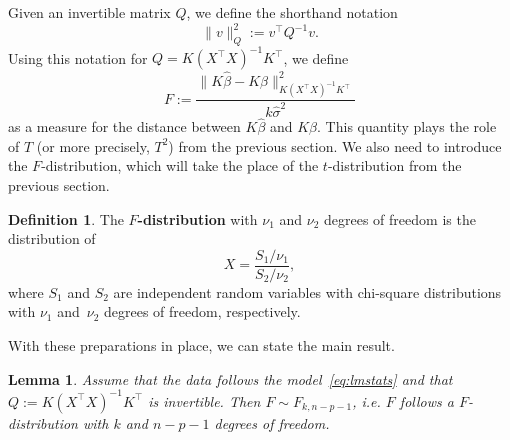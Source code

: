 \documentclass[
  a4paper,
]{article}
\newtheorem{lemma}{Lemma}[section]
\theoremstyle{definition}
\newtheorem{definition}{Definition}[section]
\theoremstyle{definition}
\theoremstyle{definition}
\theoremstyle{definition}
\theoremstyle{remark}
\begin{document}
Given an invertible matrix \(Q\), we define the shorthand notation
\begin{equation*}
  \| v \|_Q^2
  := v^\top Q^{-1} v.
\end{equation*}
Using this notation for \(Q = K(X^\top X)^{-1} K^\top\), we define
\begin{equation}
  F
  := \frac{\bigl\| K \hat\beta - K \beta \bigr\|_{K(X^\top X)^{-1} K^\top}^2}
          {k \hat\sigma^2} \label{eq:simult-F}
\end{equation}
as a measure for the distance between \(K\hat\beta\) and \(K\beta\). This
quantity plays the role of \(T\) (or more precisely, \(T^2\)) from the previous
section. We also need to introduce the \(F\)-distribution, which will take the
place of the \(t\)-distribution from the previous section.

\begin{definition}
The \textbf{\(F\)-distribution} with \(\nu_1\) and \(\nu_2\) degrees of freedom is the
distribution of
\begin{equation*}
  X
  =\frac{S_1/\nu_1}{S_2/\nu_2},
\end{equation*}
where \(S_1\) and \(S_2\) are independent random variables with chi-square
distributions with \(\nu_1\) and~\(\nu_2\) degrees of freedom, respectively.
\end{definition}

With these preparations in place, we can state the main result.

\begin{lemma}
\protect\hypertarget{lem:F-dist}{}\label{lem:F-dist}Assume that the data follows the model~\eqref{eq:lmstats}
and that \(Q := K(X^\top X)^{-1} K^\top\) is invertible.
Then \(F \sim F_{k,n-p-1}\), \emph{i.e.} \(F\) follows a
\(F\)-distribution with \(k\) and \(n-p-1\) degrees of freedom.
\end{lemma}
\end{document}
